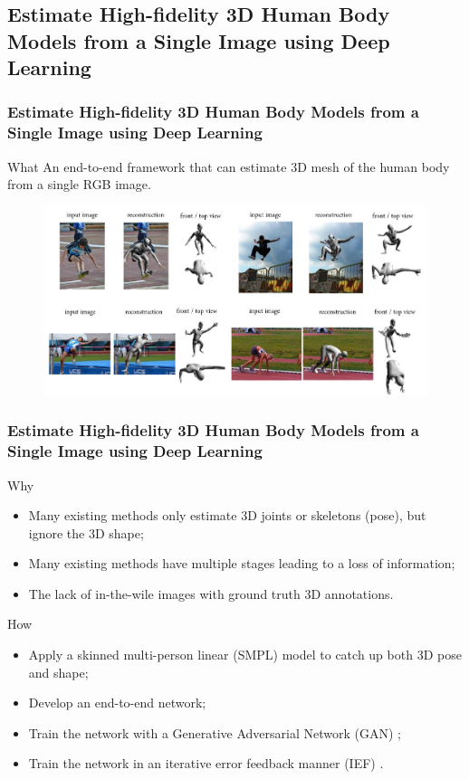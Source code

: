 \subsection{Estimate High-fidelity 3D Human Body Models from a Single Image using Deep Learning}

\begin{frame}
    \frametitle{Estimate High-fidelity 3D Human Body Models from a Single Image using Deep Learning}
    \begin{block}{What}
        \small
        An end-to-end framework that can estimate 3D mesh of the human body from a single RGB image.    
    \end{block}
    \begin{figure}
        \includegraphics[width=0.8\linewidth]{./img/results_HMR.jpg}
    \end{figure}
\end{frame}

\begin{frame}
    \frametitle{Estimate High-fidelity 3D Human Body Models from a Single Image using Deep Learning}

    \begin{block}{Why}
        \begin{itemize}
        \small
        \item Many existing methods only estimate 3D joints or skeletons (pose), but ignore the 3D shape;
        \item Many existing methods have multiple stages leading to a loss of information;
        \item The lack of in-the-wile images with ground truth 3D annotations.
        \end{itemize}    
    \end{block}

    \begin{block}{How}
        \begin{itemize}
        \small
        \item Apply a skinned multi-person linear (SMPL) model \cite{bogo2016keep} to catch up both 3D pose and shape;
        \item Develop an end-to-end network;
        \item Train the network with a Generative Adversarial Network (GAN) \cite{mirza2014conditional};
        \item Train the network in an iterative error feedback manner (IEF) \cite{carreira2016human}.
        \end{itemize}    
    \end{block}
\end{frame}

